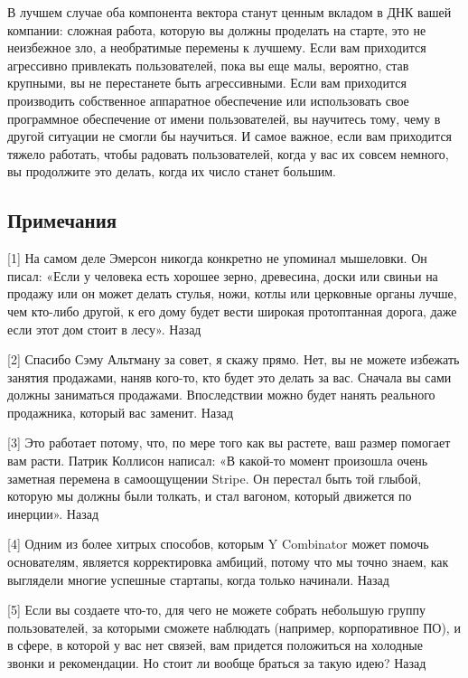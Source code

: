 \documentclass[ebook,12pt,oneside,openany]{memoir}
\begin{document}
В лучшем случае оба компонента вектора станут ценным вкладом в ДНК
вашей компании: сложная работа, которую вы должны проделать на старте,
это не неизбежное зло, а необратимые перемены к лучшему. Если вам
приходится агрессивно привлекать пользователей, пока вы еще малы,
вероятно, став крупными, вы не перестанете быть агрессивными. Если вам
приходится производить собственное аппаратное обеспечение или
использовать свое программное обеспечение от имени пользователей, вы
научитесь тому, чему в другой ситуации не смогли бы научиться. И самое
важное, если вам приходится тяжело работать, чтобы радовать
пользователей, когда у вас их совсем немного, вы продолжите это
делать, когда их число станет большим. \newline

\subsection{Примечания}

[1] На самом деле Эмерсон никогда конкретно не упоминал мышеловки. Он
писал: «Если у человека есть хорошее зерно, древесина, доски или
свиньи на продажу или он может делать стулья, ножи, котлы или
церковные органы лучше, чем кто-либо другой, к его дому будет вести
широкая протоптанная дорога, даже если этот дом стоит в лесу». Назад \newline

[2] Спасибо Сэму Альтману за совет, я скажу прямо. Нет, вы не можете
избежать занятия продажами, наняв кого-то, кто будет это делать за
вас. Сначала вы сами должны заниматься продажами. Впоследствии можно
будет нанять реального продажника, который вас заменит. Назад \newline

[3] Это работает потому, что, по мере того как вы растете, ваш размер
помогает вам расти. Патрик Коллисон написал: «В какой-то момент
произошла очень заметная перемена в самоощущении Stripe. Он перестал
быть той глыбой, которую мы должны были толкать, и стал вагоном,
который движется по инерции». Назад \newline

[4] Одним из более хитрых способов, которым Y Combinator может помочь
основателям, является корректировка амбиций, потому что мы точно
знаем, как выглядели многие успешные стартапы, когда только начинали.
Назад \newline

[5] Если вы создаете что-то, для чего не можете собрать небольшую
группу пользователей, за которыми сможете наблюдать (например,
корпоративное ПО), и в сфере, в которой у вас нет связей, вам придется
положиться на холодные звонки и рекомендации. Но стоит ли вообще
браться за такую идею? Назад \newline
\end{document}
